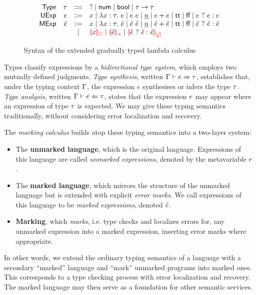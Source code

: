 \begin{figure}[htbp]
  \[\begin{array}{rrcl}
    \TMName  & \TMV  & \Coloneqq & \TUnknown \mid \TNum \mid \TBool \mid \TArrow{\TMV}{\TMV} \\
    \EMName  & \EMV  & \Coloneqq & x \mid \ELam{x}{\TMV}{\EMV} \mid \EAp{\EMV}{\EMV}
                       \mid           \ENumMV \mid \EPlus{\EMV}{\EMV}
                       \mid           \ETrue \mid \EFalse \mid \EIf{\EMV}{\EMV}{\EMV} \\
    \ECMName & \ECMV & \Coloneqq & x \mid \ECLam{x}{\TMV}{\ECMV} \mid \ECAp{\ECMV}{\ECMV}
                       \mid           \ECNumMV \mid \ECPlus{\ECMV}{\ECMV}
                       \mid           \ECTrue \mid \ECFalse \mid \ECIf{\ECMV}{\ECMV}{\ECMV} \\
             &       & \mid         & \ECUnbound{x} \mid \ECInconType{\ECMV} \mid \ECInconBr{\ECMV}{\ECMV}{\ECMV}
  \end{array}\]
  \caption{Syntax of the extended gradually typed lambda calculus}
  \label{fig:calculus-syntax}
\end{figure}

Types classify expressions by a \emph{bidirectional type system}, which employs two mutually defined
judgments. \emph{Type synthesis}, written $\Gamma \vdash e \Rightarrow \tau$, establishes that, under
the typing context $\Gamma$, the expression $e$ synthesises or infers the type $\tau$. \emph{Type
analysis}, written $\Gamma \vdash e \Leftarrow \tau$, states that the expression $e$ may appear
where an expression of type $\tau$ is expected. We may give these typing semantics traditionally,
without considering error localization and recovery.

The \emph{marking calculus} builds atop these typing semantics into a two-layer system:
%
\begin{itemize}
  \item The \textbf{unmarked language}, which is the original language. Expressions of this language
    are called \emph{unmarked expressions}, denoted by the metavariable $e$.

  \item The \textbf{marked language}, which mirrors the structure of the unmarked language but is
    extended with explicit \emph{error marks}. We call expressions of this language to be
    \emph{marked expressions}, denoted $\check{e}$.

  \item \textbf{Marking}, which \emph{marks}, i.e. type checks and localizes errors for, any unmarked
    expression into a marked expression, inserting error marks where appropriate.
\end{itemize}
%
In other words, we extend the ordinary typing semantics of a language with a secondary ``marked''
language and ``mark'' unmarked programs into marked ones. This corresponds to a type checking
process with error localization and recovery. The marked language may then serve as a foundation for
other semantic services. %


